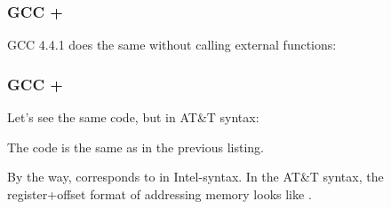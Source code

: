 \subsubsection{GCC + \IntelSyntax}

GCC 4.4.1 does the same without calling external functions:



\subsubsection{GCC + \ATTSyntax}

Let's see the same code, but in AT\&T syntax:



\myindex{\ATTSyntax}
The code is the same as in the previous listing.

By the way,  corresponds to  in Intel-syntax.
In the AT\&T syntax, the register+offset format of addressing memory looks like .

